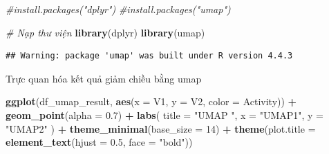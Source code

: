 \documentclass[
]{article}
\newenvironment{Shaded}{\begin{snugshade}}{\end{snugshade}}
\newcommand{\AttributeTok}[1]{\textcolor[rgb]{0.13,0.29,0.53}{#1}}
\newcommand{\CommentTok}[1]{\textcolor[rgb]{0.56,0.35,0.01}{\textit{#1}}}
\newcommand{\DecValTok}[1]{\textcolor[rgb]{0.00,0.00,0.81}{#1}}
\newcommand{\FloatTok}[1]{\textcolor[rgb]{0.00,0.00,0.81}{#1}}
\newcommand{\FunctionTok}[1]{\textcolor[rgb]{0.13,0.29,0.53}{\textbf{#1}}}
\newcommand{\NormalTok}[1]{#1}
\newcommand{\OtherTok}[1]{\textcolor[rgb]{0.56,0.35,0.01}{#1}}
\newcommand{\SpecialCharTok}[1]{\textcolor[rgb]{0.81,0.36,0.00}{\textbf{#1}}}
\newcommand{\StringTok}[1]{\textcolor[rgb]{0.31,0.60,0.02}{#1}}
\begin{document}
\begin{Shaded}
\begin{Highlighting}[]
\CommentTok{\#install.packages("dplyr")}
\CommentTok{\#install.packages("umap")}

\CommentTok{\# Nạp thư viện}
\FunctionTok{library}\NormalTok{(dplyr)}
\FunctionTok{library}\NormalTok{(umap)}
\end{Highlighting}
\end{Shaded}

\begin{verbatim}
## Warning: package 'umap' was built under R version 4.4.3
\end{verbatim}

\begin{Shaded}
\end{Shaded}

Trực quan hóa kết quả giảm chiều bằng umap

\begin{Shaded}
\begin{Highlighting}[]
\FunctionTok{ggplot}\NormalTok{(df\_umap\_result, }\FunctionTok{aes}\NormalTok{(}\AttributeTok{x =}\NormalTok{ V1, }\AttributeTok{y =}\NormalTok{ V2, }\AttributeTok{color =}\NormalTok{ Activity)) }\SpecialCharTok{+}
  \FunctionTok{geom\_point}\NormalTok{(}\AttributeTok{alpha =} \FloatTok{0.7}\NormalTok{) }\SpecialCharTok{+}
  \FunctionTok{labs}\NormalTok{(}
    \AttributeTok{title =} \StringTok{"UMAP "}\NormalTok{,}
    \AttributeTok{x =} \StringTok{"UMAP1"}\NormalTok{,}
    \AttributeTok{y =} \StringTok{"UMAP2"}
\NormalTok{  ) }\SpecialCharTok{+}
  \FunctionTok{theme\_minimal}\NormalTok{(}\AttributeTok{base\_size =} \DecValTok{14}\NormalTok{) }\SpecialCharTok{+}
  \FunctionTok{theme}\NormalTok{(}\AttributeTok{plot.title =} \FunctionTok{element\_text}\NormalTok{(}\AttributeTok{hjust =} \FloatTok{0.5}\NormalTok{, }\AttributeTok{face =} \StringTok{"bold"}\NormalTok{))}
\end{Highlighting}
\end{Shaded}
\end{document}
